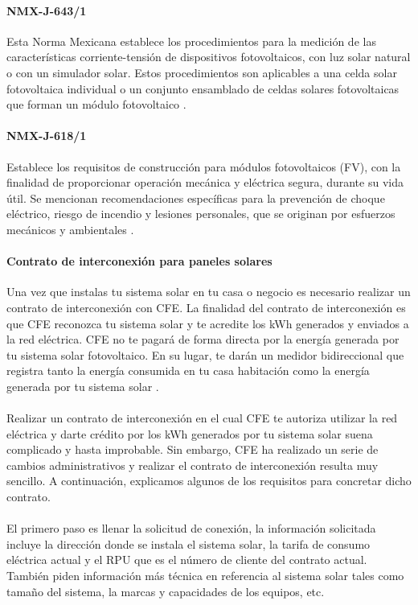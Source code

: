 \paragraph{NMX-J-643/1}
Esta Norma Mexicana establece los procedimientos para la medición de las
características corriente-tensión de dispositivos fotovoltaicos,
con luz solar natural o con un simulador solar. Estos
procedimientos son aplicables a una celda solar fotovoltaica
individual o un conjunto ensamblado de celdas solares
fotovoltaicas que forman un módulo fotovoltaico \citep{NMX-J-643/1}.

\paragraph{NMX-J-618/1}
Establece los requisitos de construcción para módulos fotovoltaicos (FV), con la finalidad de proporcionar operación mecánica y eléctrica segura, durante su vida útil. Se mencionan recomendaciones específicas para la prevención de choque eléctrico, riesgo de incendio y lesiones personales, que se originan por esfuerzos mecánicos y ambientales \citep{NMX-J-618/1}.

\paragraph{Contrato de interconexión para paneles solares}

Una vez que instalas tu sistema solar en tu casa o negocio es necesario realizar un contrato de interconexión con CFE. La finalidad del contrato de interconexión es que CFE reconozca tu sistema solar y te acredite los kWh generados y enviados a la red eléctrica. CFE no te pagará de forma directa por la energía generada por tu sistema solar fotovoltaico. En su lugar, te darán un medidor bidireccional que registra tanto la energía consumida en tu casa habitación como la energía generada por tu sistema solar \citep{ContratoSolar}.
\paragraph{}
Realizar un contrato de interconexión en el cual CFE te autoriza utilizar la red eléctrica y darte crédito por los kWh generados por tu sistema solar suena complicado y hasta improbable. Sin embargo, CFE ha realizado un serie de cambios administrativos y realizar el contrato de interconexión resulta muy sencillo. A continuación, explicamos algunos de los requisitos para concretar dicho contrato.
\paragraph{}
El primero paso es llenar la solicitud de conexión, la información solicitada incluye la dirección donde se instala el sistema solar, la tarifa de consumo eléctrica actual y el RPU que es el número de cliente del contrato actual. También piden información más técnica en referencia al sistema solar tales como tamaño del sistema, la marcas y capacidades de los equipos, etc.
